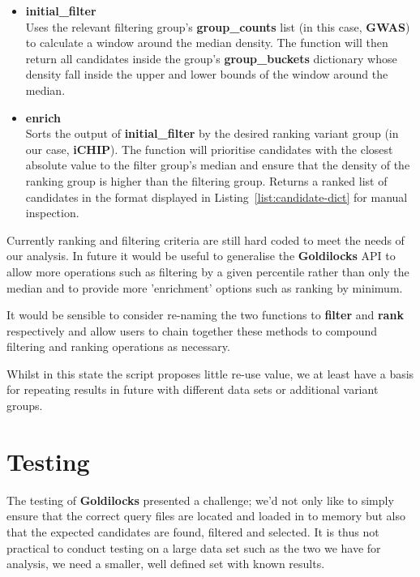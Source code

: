 \begin{itemize}
    \item \textbf{initial\_filter} \hfill\\
        Uses the relevant filtering group's \textbf{group\_counts} list (in this case,
        \textbf{GWAS}) to calculate a window around the median density. The
        function will then return all candidates inside the group's
        \textbf{group\_buckets} dictionary whose density fall inside the upper
        and lower bounds of the window around the median.

    \item \textbf{enrich} \hfill\\
        Sorts the output of \textbf{initial\_filter} by the desired ranking
        variant group (in our case, \textbf{iCHIP}). The function will
        prioritise candidates with the closest absolute value to the filter group's median
        and ensure that the density of the ranking group is higher than the
        filtering group. Returns a ranked list of candidates in the format
        displayed in Listing~\ref{list:candidate-dict} for manual inspection.
\end{itemize}

Currently ranking and filtering criteria are still hard coded to meet the needs
of our analysis.  In future it would be useful to generalise the
\textbf{Goldilocks} API to allow more operations such as filtering by a given
percentile rather than only the median and to provide more 'enrichment' options
such as ranking by minimum.

It would be sensible to consider re-naming the two functions to \textbf{filter}
and \textbf{rank} respectively and allow users to chain together these methods
to compound filtering and ranking operations as necessary.

Whilst in this state the script proposes little re-use value, we at least have a
basis for repeating results in future with different data sets or additional
variant groups.



\section{Testing}

The testing of \textbf{Goldilocks} presented a challenge; we'd not only like
to simply ensure that the correct query files are located and loaded in to
memory but also that the expected candidates are found, filtered and selected.
It is thus not practical to conduct testing on a large data set such as the two
we have for analysis, we need a smaller, well defined set with known results.

